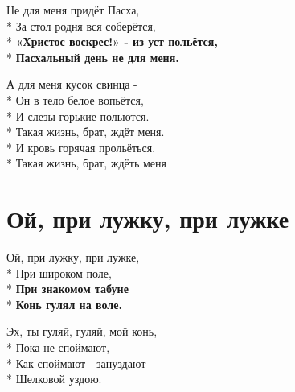 \medskip

\begin{minipage}{\linewidth}
Не для меня придёт Пасха,\\*
За стол родня вся соберётся,\\*
\textbf{«Христос воскрес!» - из уст польётся,}\\*
\textbf{Пасхальный день не для меня.}\\
\end{minipage}\par\medskip\nobreak

\medskip

\begin{minipage}{\linewidth}
А для меня кусок свинца -\\*
Он в тело белое вопьётся,\\*
И слезы горькие польются.\\*
Такая жизнь, брат, ждёт меня.\\*
И кровь горячая прольёться.\\*
Такая жизнь, брат, ждёть меня\\
\end{minipage}

\vspace{\fill}\newpage

\section{Ой, при лужку, при лужке}
\label{song:Ой,_при_лужку,_при_лужке}

\medskip

\begin{minipage}{\linewidth}
Ой, при лужку, при лужке,\\*
При широком поле,\\*
\textbf{При знакомом табуне}\\*
\textbf{Конь гулял на воле.}\\
\end{minipage}\par\medskip\nobreak

\medskip

\begin{minipage}{\linewidth}
Эх, ты гуляй, гуляй, мой конь,\\*
Пока не споймают,\\*
Как споймают - зануздают\\*
Шелковой уздою.\\
\end{minipage}\par\medskip\nobreak

